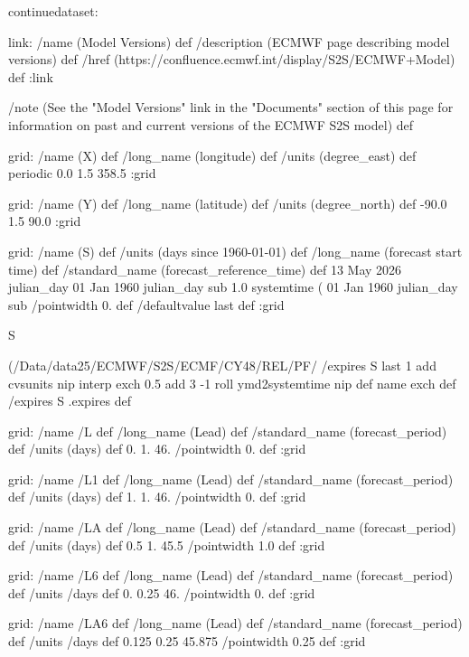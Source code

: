 \begin{ingrid}
continuedataset:

link:
 /name (Model Versions) def
 /description (ECMWF page describing model versions) def
 /href (https://confluence.ecmwf.int/display/S2S/ECMWF+Model) def
:link

/note (See the "Model Versions" link in the "Documents" section of this page for information on past and current versions of the ECMWF S2S model) def

grid:
/name (X) def
/long_name (longitude) def
/units (degree_east) def
periodic
0.0 1.5 358.5
:grid

grid:
/name (Y) def
/long_name (latitude) def
/units (degree_north) def
-90.0 1.5 90.0
:grid

grid:
/name (S) def
/units (days since 1960-01-01) def
/long_name (forecast start time) def
/standard_name (forecast_reference_time) def
13 May 2026 julian_day 01 Jan 1960 julian_day sub
1.0
systemtime
(%
01 Jan 1960 julian_day sub
/pointwidth 0. def
/defaultvalue { last } def
:grid


S {(/Data/data25/ECMWF/S2S/ECMF/CY48/REL/PF/%
/expires
  S last
    1 add
    cvsunits nip interp exch
      0.5 add
      3 -1 roll
      ymd2systemtime
    nip
def
name exch def
/expires S  .expires def


grid:
/name /L def
/long_name (Lead) def
/standard_name (forecast_period) def
/units (days) def
0. 1. 46.
/pointwidth 0. def
:grid

grid:
/name /L1 def
/long_name (Lead) def
/standard_name (forecast_period) def
/units (days) def
1. 1. 46.
/pointwidth 0. def
:grid

grid:
/name /LA def
/long_name (Lead) def
/standard_name (forecast_period) def
/units (days) def
0.5 1. 45.5
/pointwidth 1.0 def
:grid

grid:
/name /L6 def
/long_name (Lead) def
/standard_name (forecast_period) def
/units /days def
0. 0.25 46.
/pointwidth 0. def
:grid

grid:
/name /LA6 def
/long_name (Lead) def
/standard_name (forecast_period) def
/units /days def
0.125 0.25 45.875
/pointwidth 0.25 def
:grid

}
\end{ingrid}
